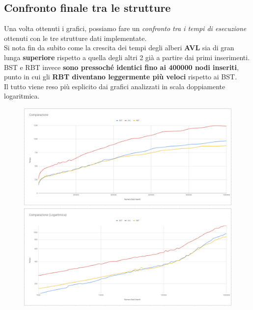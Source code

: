 \documentclass[a4paper]{article}
\begin{document}
		\subsection{Confronto finale tra le strutture}
		Una volta ottenuti i grafici, possiamo fare un \textit{confronto tra i tempi di esecuzione} ottenuti con le tre strutture dati implementate.\\
		Si nota fin da subito come la crescita dei tempi degli alberi \textbf{AVL} sia di gran lunga \textbf{superiore} rispetto a quella degli altri 2 già a partire dai primi inserimenti.\\
		BST e RBT invece \textbf{sono pressoché identici fino ai 400000 nodi inseriti}, punto in cui gli \textbf{RBT diventano leggermente più veloci} rispetto ai BST. \\
		Il tutto viene reso più esplicito dai grafici analizzati in scala doppiamente logaritmica.
		\begin{figure}[ht]
			\includegraphics[width=13cm]{ComaprazioneLIN}
			\includegraphics[width=13cm]{ComparazioneLOG}
		\end{figure}
	
\end{document}
